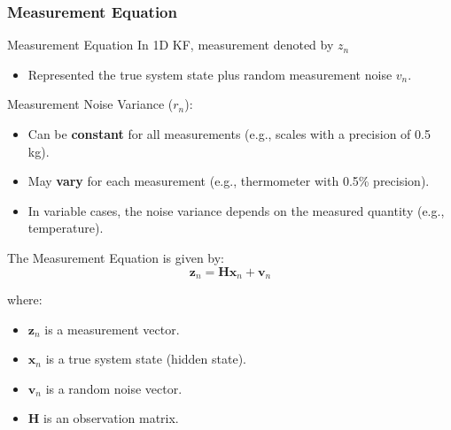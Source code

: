 \subsubsection{Measurement Equation}
\begin{frame}{Measurement Equation}
In 1D KF, measurement denoted by $z_n$
\begin{itemize}
    \item Represented the true system state plus random measurement noise $v_n$.
\end{itemize}

Measurement Noise Variance ($r_n$):
\begin{itemize}
    \item Can be \textbf{constant} for all measurements (e.g., scales with a precision of 0.5 kg).
    \item May \textbf{vary} for each measurement (e.g., thermometer with 0.5\% precision).
    \item In variable cases, the noise variance depends on the measured quantity (e.g., temperature).
\end{itemize}

\begin{minipage}{1\linewidth} 
\begin{exampleblock}{}{
The Measurement Equation is given by:
\begin{equation*}
\mathbf{z}_n = \mathbf{H}\mathbf{x}_n + \mathbf{v}_n
\end{equation*}

where:
\begin{itemize}
    \item $\mathbf{z}_n$ is a measurement vector.
    \item $\mathbf{x}_n$ is a true system state (hidden state).
    \item $\mathbf{v}_n$ is a random noise vector.
    \item $\mathbf{H}$ is an observation matrix.
\end{itemize}}
\end{exampleblock}
\end{minipage}

\end{frame}
